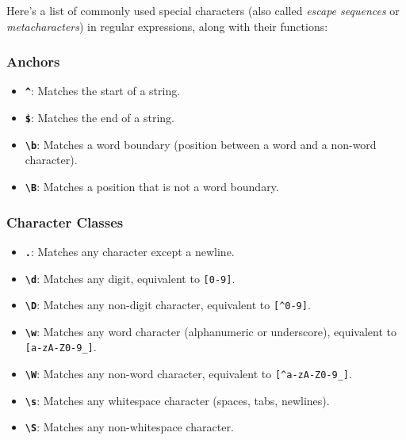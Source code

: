 \documentclass[
  letterpaper,
  DIV=11,
  numbers=noendperiod]{scrreprt}
\providecommand{\tightlist}{%
  \setlength{\itemsep}{0pt}\setlength{\parskip}{0pt}}\usepackage{longtable,booktabs,array}
\begin{document}
Here's a list of commonly used special characters (also called
\emph{escape sequences} or \emph{metacharacters}) in regular
expressions, along with their functions:

\hypertarget{anchors}{%
\subsubsection{Anchors}\label{anchors}}

\begin{itemize}
\tightlist
\item
  \textbf{\texttt{\^{}}}: Matches the start of a string.
\item
  \textbf{\texttt{\$}}: Matches the end of a string.
\item
  \textbf{\texttt{\textbackslash{}b}}: Matches a word boundary (position
  between a word and a non-word character).
\item
  \textbf{\texttt{\textbackslash{}B}}: Matches a position that is not a
  word boundary.
\end{itemize}

\hypertarget{character-classes}{%
\subsubsection{Character Classes}\label{character-classes}}

\begin{itemize}
\tightlist
\item
  \textbf{\texttt{.}}: Matches any character except a newline.
\item
  \textbf{\texttt{\textbackslash{}d}}: Matches any digit, equivalent to
  \texttt{{[}0-9{]}}.
\item
  \textbf{\texttt{\textbackslash{}D}}: Matches any non-digit character,
  equivalent to \texttt{{[}\^{}0-9{]}}.
\item
  \textbf{\texttt{\textbackslash{}w}}: Matches any word character
  (alphanumeric or underscore), equivalent to
  \texttt{{[}a-zA-Z0-9\_{]}}.
\item
  \textbf{\texttt{\textbackslash{}W}}: Matches any non-word character,
  equivalent to \texttt{{[}\^{}a-zA-Z0-9\_{]}}.
\item
  \textbf{\texttt{\textbackslash{}s}}: Matches any whitespace character
  (spaces, tabs, newlines).
\item
  \textbf{\texttt{\textbackslash{}S}}: Matches any non-whitespace
  character.
\end{itemize}
\end{document}
